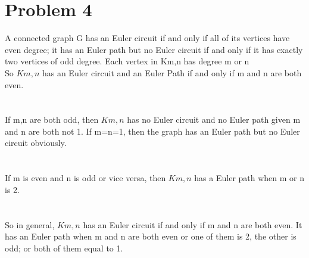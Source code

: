 \documentclass{article}
\begin{document}
\section{Problem 4}
A connected graph G
 has an Euler circuit if and only if all of its vertices have even degree; it has an Euler path but no Euler circuit if and only if it has exactly two vertices of odd degree. Each vertex in Km,n
 has degree m
 or n\\
 So $K{m,n}$ has an Euler circuit and an Euler Path
 if and only if m
 and n
 are both even.\\
\\ \hspace*{\fill} \\
If m,n are both odd, then $K{m,n}$ has no Euler circuit and no Euler path given m and n are both not 1. If m=n=1, then the graph has an Euler path but no Euler circuit obviously.\\
\\ \hspace*{\fill} \\
If m is even and n is odd or vice versa, then $K{m,n}$ has a Euler path when m or n is 2. \\
\\ \hspace*{\fill} \\
So in general, $K{m,n}$ has an Euler circuit if and only if m and n are both even. It has an Euler path when m and n are both even or one of them is 2, the other is odd; or both of them equal to 1.\\
\newpage
\end{document}
